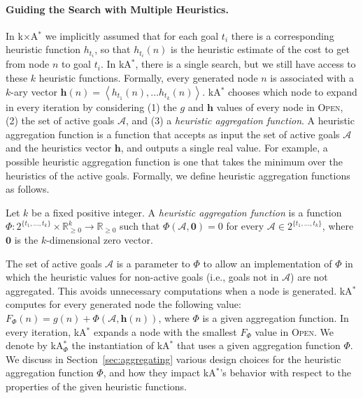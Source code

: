 \documentclass[smallextended]{svjour3}       %
\newcommand{\astar}{A$^*$\xspace}
\newcommand{\kastar}{kA$^*$\xspace}
\newcommand{\kastarphi}{\textup{kA}$^*_{\Phi}$\xspace}
\newcommand{\kxastar}{k$\times$A$^*$\xspace}
\newcommand{\tuple}[1]{\ensuremath{\left \langle #1 \right \rangle }}
\newcommand{\open}{\textsc{Open}\xspace}
\newcommand{\activeg}{\mathcal{A}}
\newcommand{\vect}[1]{\mathbf{#1}}
\newcommand{\nonnegreals}{\mathbb{R}_{\geq 0}}
\begin{document}
\paragraph{Guiding the Search with Multiple Heuristics.}
In \kxastar we implicitly assumed that for each goal $t_i$ there is a corresponding heuristic function $h_{t_i}$, so that $h_{t_i}(n)$ is the heuristic estimate of the cost to get from node $n$ to goal $t_i$. 
In \kastar, there is a single search, but we still have access to these $k$ heuristic functions. Formally, every generated node $n$ is associated with a $k$-ary vector $\vect{h}(n) = \tuple{h_{t_1}(n), \ldots h_{t_k}(n)}$. \kastar chooses which node to expand in every iteration by considering 
(1) the $g$ and $\vect{h}$ values of every node in \open,
(2) the set of active goals $\activeg$,
and (3) a \emph{heuristic aggregation function}. 
A heuristic aggregation function is a function that accepts as input the set of active goals $\mathcal{A}$ and the heuristics vector $\vect{h}$, and outputs a single real value. For example, a possible heuristic aggregation function is one that takes the minimum over the heuristics of the active goals. Formally, we define heuristic aggregation functions as follows. %
\begin{definition}
	Let $k$ be a fixed positive integer.
	A \emph{heuristic aggregation function} is a function $\Phi: 
	2^{\{t_1,..., t_k\}}\times \nonnegreals^k \rightarrow \nonnegreals$ such that 
	$\Phi(\activeg, \vect{0}) = 0$ 
	for every $\activeg\in 2^{\{t_1,..., t_k\}}$, where $\vect{0}$ is the $k$-dimensional zero vector.
	\label{def:aggregation}
\end{definition}
The set of active goals $\activeg$ is a parameter to $\Phi$ to allow an implementation of $\Phi$ in which the heuristic values for non-active goals (i.e., goals not in $\activeg$) are not aggregated. This avoids unnecessary computations when a node is generated. \kastar computes for every generated node the following value: $F_\Phi(n) = g(n) + \Phi(\activeg, \vect{h}(n))$, where $\Phi$ is a given aggregation function. In every iteration, \kastar expands a node with the smallest $F_\Phi$ value in \open. We denote by \kastarphi the instantiation of \kastar that uses a given aggregation function $\Phi$. We discuss in Section~\ref{sec:aggregating} various design choices for  the heuristic aggregation function $\Phi$, and how they impact \kastar's behavior with respect to the properties of the given heuristic functions. 
\end{document}
